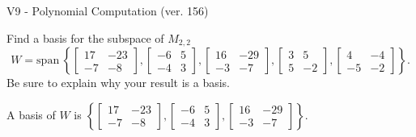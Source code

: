\begin{exercise}
  \begin{exerciseTitle}V9 - Polynomial Computation (ver. 156)\end{exerciseTitle}
  \begin{exerciseStatement}
    Find a basis for the subspace of \(M_{2,2}\) 
\[W=\mathrm{span}\ \left\{\left[\begin{array}{cc}
17 & -23 \\
-7 & -8
\end{array}\right] , \left[\begin{array}{cc}
-6 & 5 \\
-4 & 3
\end{array}\right] , \left[\begin{array}{cc}
16 & -29 \\
-3 & -7
\end{array}\right] , \left[\begin{array}{cc}
3 & 5 \\
5 & -2
\end{array}\right] , \left[\begin{array}{cc}
4 & -4 \\
-5 & -2
\end{array}\right]\right\}.\]
 Be sure to explain why your result is a basis.


  \end{exerciseStatement}
  \begin{exerciseAnswer}
   A basis of \(W\) is  \(\left\{\left[\begin{array}{cc}
17 & -23 \\
-7 & -8
\end{array}\right] , \left[\begin{array}{cc}
-6 & 5 \\
-4 & 3
\end{array}\right] , \left[\begin{array}{cc}
16 & -29 \\
-3 & -7
\end{array}\right]\right\}\).
  


  \end{exerciseAnswer}
\end{exercise}